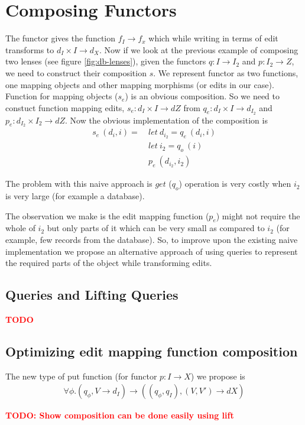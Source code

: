 \documentclass[a4paper,10pt]{article}
\newcommand{\finish}[1]{#1}
\newcommand{\comment}[1]{\finish{\textbf{\textcolor{red}{#1}}}}
\begin{document}
\section{Composing Functors}
The functor gives the function $f_I \to f_x$ which while writing in
terms of edit transforms to $d_I \times I \to d_X$. Now if we look at
the previous example of composing two lenses (see figure
\ref{fig:db-lenses}), given the functors $q: I \to I_2$ and $p: I_2
\to Z$, we need to construct their composition $s$. We represent
functor as two functions, one mapping objects and other mapping
morphisms (or edits in our case). Function for mapping objects ($s_e$)
is an obvious composition. So we need to constuct function mapping
edits, $s_e: d_I \times I \to dZ$ from $q_{e}: d_I \times I \to
d_{I_2}$ and $p_{e}: d_{I_2} \times I_2 \to dZ$. Now the obvious
implementation of the composition is
\begin{align*}
s_e~(d_i,i) =~& let~d_{i_2} = q_{e}~(d_i,i) \\
                 & let~i_2 = q_{o}~(i) \\
                 & p_{e}~(d_{i_2},i_2) 
\end{align*}

The problem with this naive approach is $get$ ($q_{o}$) operation is
very costly when $i_2$ is very large (for example a database). 

The observation we make is the edit mapping function ($p_{e}$)
might not require the whole of $i_2$ but only parts of it which can be
very small as compared to $i_2$ (for example, few records from the
database). So, to improve upon the existing naive implementation we
propose an alternative approach of using queries to represent the
required parts of the object while transforming edits.

\subsection{Queries and Lifting Queries}
\comment{TODO}

\subsection{Optimizing edit mapping function composition}
The new type of put function (for functor $p: I \to X$) we propose is
\begin{align*}
\forall \phi. (q_{\phi}, V \to d_I) \to ((q_{\phi},q_I), (V,V') \to dX) 
\end{align*}

\comment{TODO: Show composition can be done easily using lift} 
\end{document}
